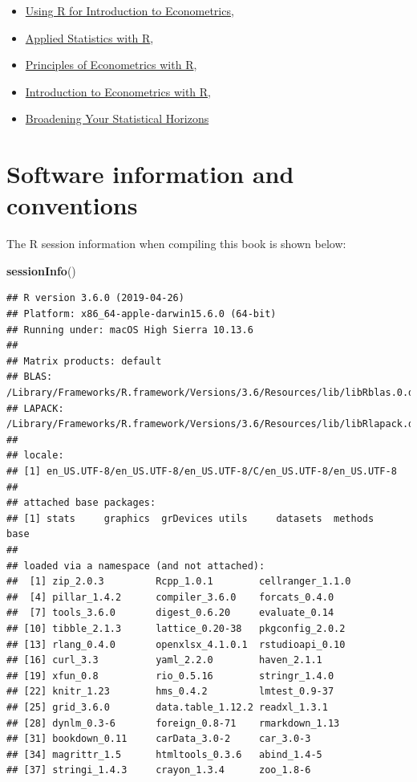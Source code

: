\documentclass[]{book}
\newenvironment{Shaded}{\begin{snugshade}}{\end{snugshade}}
\newcommand{\KeywordTok}[1]{\textcolor[rgb]{0.13,0.29,0.53}{\textbf{#1}}}
\newcommand{\NormalTok}[1]{#1}
\providecommand{\tightlist}{%
  \setlength{\itemsep}{0pt}\setlength{\parskip}{0pt}}
\begin{document}
\begin{itemize}
\tightlist
\item
  \href{https://emwikts1970.github.io/URFITE-Bookdown/}{Using R for Introduction to Econometrics}, \citet{Hanck2018}
\item
  \href{https://daviddalpiaz.github.io/appliedstats/}{Applied Statistics with R}, \citet{dalpiaz2016}
\item
  \href{https://bookdown.org/ccolonescu/RPoE4/}{Principles of Econometrics with R}, \citet{colonescu2018}
\item
  \href{https://scpoecon.github.io/ScPoEconometrics/}{Introduction to Econometrics with R}, \citet{oswald2018introduction}
\item
  \href{https://bookdown.org/roback/bookdown-bysh/}{Broadening Your Statistical Horizons}
\end{itemize}

\hypertarget{software-information-and-conventions}{%
\section*{Software information and conventions}\label{software-information-and-conventions}}

The R session information when compiling this book is shown below:

\begin{Shaded}
\begin{Highlighting}[]
\KeywordTok{sessionInfo}\NormalTok{()}
\end{Highlighting}
\end{Shaded}

\begin{verbatim}
## R version 3.6.0 (2019-04-26)
## Platform: x86_64-apple-darwin15.6.0 (64-bit)
## Running under: macOS High Sierra 10.13.6
## 
## Matrix products: default
## BLAS:   /Library/Frameworks/R.framework/Versions/3.6/Resources/lib/libRblas.0.dylib
## LAPACK: /Library/Frameworks/R.framework/Versions/3.6/Resources/lib/libRlapack.dylib
## 
## locale:
## [1] en_US.UTF-8/en_US.UTF-8/en_US.UTF-8/C/en_US.UTF-8/en_US.UTF-8
## 
## attached base packages:
## [1] stats     graphics  grDevices utils     datasets  methods   base     
## 
## loaded via a namespace (and not attached):
##  [1] zip_2.0.3         Rcpp_1.0.1        cellranger_1.1.0 
##  [4] pillar_1.4.2      compiler_3.6.0    forcats_0.4.0    
##  [7] tools_3.6.0       digest_0.6.20     evaluate_0.14    
## [10] tibble_2.1.3      lattice_0.20-38   pkgconfig_2.0.2  
## [13] rlang_0.4.0       openxlsx_4.1.0.1  rstudioapi_0.10  
## [16] curl_3.3          yaml_2.2.0        haven_2.1.1      
## [19] xfun_0.8          rio_0.5.16        stringr_1.4.0    
## [22] knitr_1.23        hms_0.4.2         lmtest_0.9-37    
## [25] grid_3.6.0        data.table_1.12.2 readxl_1.3.1     
## [28] dynlm_0.3-6       foreign_0.8-71    rmarkdown_1.13   
## [31] bookdown_0.11     carData_3.0-2     car_3.0-3        
## [34] magrittr_1.5      htmltools_0.3.6   abind_1.4-5      
## [37] stringi_1.4.3     crayon_1.3.4      zoo_1.8-6
\end{verbatim}
\end{document}
